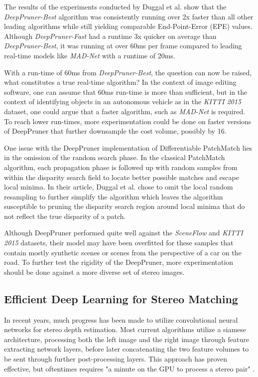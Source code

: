 \documentclass{article}
\begin{document}
The results of the experiments conducted by Duggal et al. \citep{duggal2019deeppruner} show that the \textit{DeepPruner-Best} algorithm was consistently running over 2x faster than all other leading algorithms while still yielding comparable End-Point-Error (EPE) values. Although \textit{DeepPruner-Fast} had a runtime 3x quicker on average than \textit{DeepPruner-Best}, it was running at over 60ms per frame compared to leading real-time models like \textit{MAD-Net} \citep{tonioni2019real} with a runtime of 20ms.

With a run-time of 60ms from \textit{DeepPruner-Best}, the question can now be raised, what constitutes a true real-time algorithm? In the context of image editing software, one can assume that 60ms run-time is more than sufficient, but in the context of identifying objects in an autonomous vehicle as in the \textit{KITTI 2015} \citep{geiger2012we} dataset, one could argue that a faster algorithm, such as \textit{MAD-Net} \citep{tonioni2019real} is required. To reach lower run-times, more experimentation could be done on faster versions of DeepPruner \citep{duggal2019deeppruner} that further downsample the cost volume, possibly by 16.

One issue with the DeepPruner implementation of Differentiable PatchMatch lies in the omission of the random search phase. In the classical PatchMatch algorithm, each propagation phase is followed up with random samples from within the disparity search field to locate better possible matches and escape local minima. In their article, Duggal et al. \citep{duggal2019deeppruner} chose to omit the local random resampling to further simplify the algorithm which leaves the algorithm susceptible to pruning the disparity search region around local minima that do not reflect the true disparity of a patch.

Although DeepPruner performed quite well against the \textit{SceneFlow} \citep{mayer2016large} and \textit{KITTI 2015} \citep{geiger2012we} datasets, their model may have been overfitted for these samples that contain mostly synthetic scenes or scenes from the perspective of a car on the road. To further test the rigidity of the DeepPruner, more experimentation should be done against a more diverse set of stereo images.

\subsection{Efficient Deep Learning for Stereo Matching \citep{luo2016efficient}}
\label{efficient}
In recent years, much progress has been made to utilize convolutional neural networks for stereo depth estimation. Most current algorithms utilize a siamese architecture, processing both the left image and the right image through feature extracting network layers, before later concatenating the two feature volumes to be sent through further post-processing layers. This approach has proven effective, but oftentimes requires "a minute on the GPU to process a stereo pair" \citep{luo2016efficient}.
\end{document}
